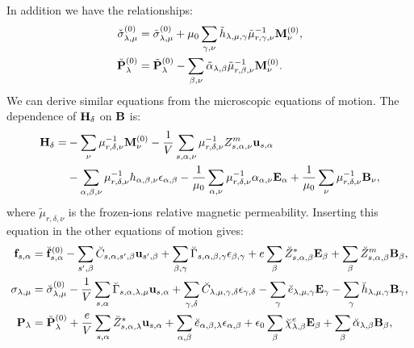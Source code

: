 \documentclass[12pt,a4paper]{article}
\begin{document}
In addition we have the relationships:
\begin{align}
\check \sigma^{(0)}_{\lambda,\mu} &= \tilde \sigma^{(0)}_{\lambda,\mu}
+ \mu_0 \sum_{\gamma,\nu} \tilde h_{\lambda,\mu,\gamma} 
\tilde \mu^{-1}_{r,\gamma,\nu} {\bf M}^{(0)}_\nu,  \\
\check {\bf P}^{(0)}_{\lambda} &= \tilde {\bf P}^{(0)}_{\lambda}
- \sum_{\beta,\nu} \tilde \alpha_{\lambda,\beta} 
\tilde \mu^{-1}_{r,\beta,\nu} {\bf M}^{(0)}_\nu. 
\end{align}
We can derive similar equations from the microscopic equations of motion.
The dependence of ${\bf H}_\delta$ on ${\bf B}$ is:
\begin{align}
{\bf H}_\delta = 
&- \sum_\nu \mu^{-1}_{r,\delta,\nu} {\bf M}^{(0)}_\nu 
-{1\over V} \sum_{s,\alpha,\nu} \mu^{-1}_{r,\delta,\nu} Z^m_{s,\alpha,\nu}
{\bf u}_{s,\alpha} \nonumber\\
&- \sum_{\alpha,\beta,\nu} \mu^{-1}_{r,\delta,\nu} h_{\alpha,\beta,\nu}
\epsilon_{\alpha,\beta} - {1\over \mu_0} \sum_{\alpha,\nu}
\mu^{-1}_{r,\delta,\nu} \alpha_{\alpha,\nu} {\bf E}_\alpha
+ {1\over \mu_0} \sum_\nu \mu^{-1}_{r,\delta,\nu} {\bf B}_\nu, 
\end{align}
where $\tilde \mu_{r,\delta,\nu}$ is the frozen-ions relative magnetic
permeability.
Inserting this equation in the other equations of motion gives:
\begin{align}
{\bf f}_{s,\alpha}&= \breve{\bf f}^{(0)}_{s,\alpha}
-\sum_{s',\beta} \breve C_{s,\alpha,s',\beta} {\bf u}_{s',\beta}
+\sum_{\beta,\gamma}
\breve \Gamma_{s,\alpha,\beta,\gamma} 
\epsilon_{\beta,\gamma} +
e \sum_{\beta} \breve Z^*_{s,\alpha,\beta} {\bf E}_{\beta}
+\sum_{\beta} 
\breve Z^m_{s,\alpha,\beta} {\bf B}_{\beta}, \\
\sigma_{\lambda,\mu}&= \breve  \sigma_{\lambda,\mu}^{(0)}
-{1\over V} \sum_{s,\alpha}
\breve \Gamma_{s,\alpha,\lambda,\mu} {\bf u}_{s,\alpha}
+\sum_{\gamma,\delta} \breve C_{\lambda,\mu,\gamma,\delta}  
\epsilon_{\gamma,\delta} -
\sum_{\gamma} \breve e_{\lambda,\mu,\gamma} 
 {\bf E}_{\gamma}
-\sum_{\gamma}  \breve h_{\lambda,\mu,\gamma} 
{\bf B}_{\gamma}, \\
{\bf P}_{\lambda}&=  \breve {\bf P}^{(0)}_{\lambda}
+{e\over V} \sum_{s,\alpha} \breve Z^*_{s,\alpha,\lambda} 
{\bf u}_{s,\alpha} +
\sum_{\alpha,\beta} \breve e_{\alpha,\beta,\lambda} 
\epsilon_{\alpha,\beta} +
\epsilon_0 \sum_{\beta} 
\breve \chi^e_{\lambda,\beta}
{\bf E}_{\beta} +
\sum_{\beta} \breve \alpha_{\lambda,\beta} 
{\bf B}_{\beta}, 
\end{align}
\end{document}
